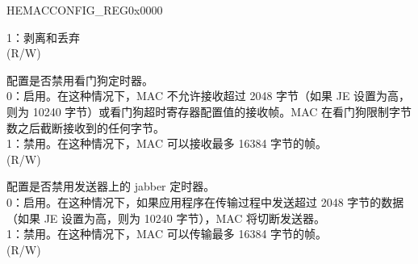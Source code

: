 \begin{register}{H}{EMACCONFIG\_REG}{0x0000}
\begin{regdesc}
\begin{reglist}
1：剥离和丢弃\\(R/W)
\item [EMACWATCHDOG] 配置是否禁用看门狗定时器。\\
0：启用。在这种情况下，MAC 不允许接收超过 2048 字节（如果 JE 设置为高，则为 10240 字节）或看门狗超时寄存器配置值的接收帧。MAC 在看门狗限制字节数之后截断接收到的任何字节。\\
1：禁用。在这种情况下，MAC 可以接收最多 16384 字节的帧。\\(R/W)
\item [EMACJABBER] 配置是否禁用发送器上的 jabber 定时器。\\
0：启用。在这种情况下，如果应用程序在传输过程中发送超过 2048 字节的数据（如果 JE 设置为高，则为 10240 字节），MAC 将切断发送器。\\
1：禁用。在这种情况下，MAC 可以传输最多 16384 字节的帧。\\(R/W)

\item[见下页...]
\end{reglist}\end{regdesc}
\end{register}
\addtocounter{Regfloat}{-1}
